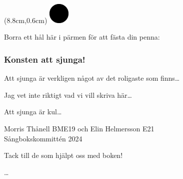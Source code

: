 
\begin{textblock*}{3cm}(8.8cm,0.6cm) %
   \includegraphics[width=1.0cm]{./bilder/cirkel.png}
\end{textblock*}

\vspace*{-8mm}
Borra ett hål här i pärmen för att fästa din penna: %

\subsubsection*{Konsten att sjunga!}
Att sjunga är verkligen något av det roligaste som finns\dots


Jag vet inte riktigt vad vi vill skriva här\dots

Att sjunga är kul\dots



Morris Thånell BME19 och Elin Helmersson E21\\
Sångbokskommittén 2024



\newpage

Tack till de som hjälpt oss med boken!

\dots













